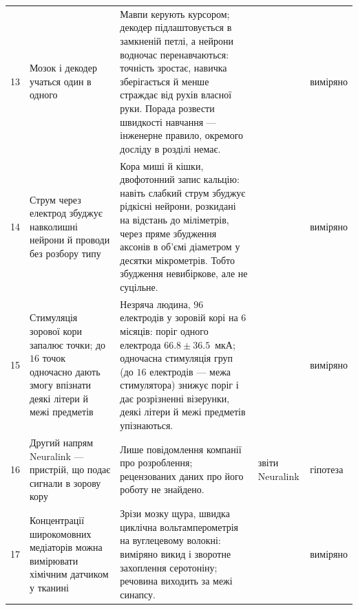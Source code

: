{\begin{longtable}{>{\raggedright}p{0.5cm}>{\raggedright}p{4.0cm}>{\raggedright}p{5.6cm}>{\raggedright}p{2.3cm}>{\raggedright\arraybackslash}p{1.7cm}}
13 & Мозок і декодер учаться один в одного & Мавпи керують курсором; декодер підлаштовується в замкненій петлі, а нейрони водночас перенавчаються: точність зростає, навичка зберігається й менше страждає від рухів власної руки. Порада розвести швидкості навчання --- інженерне правило, окремого досліду в розділі немає. & \cite{Orsborn2014coad} & виміряно \\
14 & Струм через електрод збуджує навколишні нейрони й проводи без розбору типу & Кора миші й кішки, двофотонний запис кальцію: навіть слабкий струм збуджує рідкісні нейрони, розкидані на відстань до міліметрів, через пряме збудження аксонів в об'ємі діаметром у десятки мікрометрів. Тобто збудження невибіркове, але не суцільне. & \cite{Histed2009stim} & виміряно \\
15 & Стимуляція зорової кори запалює точки; до $16$ точок одночасно дають змогу впізнати деякі літери й межі предметів & Незряча людина, $96$ електродів у зоровій корі на $6$ місяців: поріг одного електрода $66.8\pm36.5$~мкА; одночасна стимуляція груп (до $16$ електродів --- межа стимулятора) знижує поріг і дає розрізненні візерунки, деякі літери й межі предметів упізнаються. & \cite{Fernandez2021} & виміряно \\
16 & Другий напрям Neuralink --- пристрій, що подає сигнали в зорову кору & Лише повідомлення компанії про розроблення; рецензованих даних про його роботу не знайдено. & звіти Neuralink & гіпотеза \\
17 & Концентрації широкомовних медіаторів можна вимірювати хімічним датчиком у тканині & Зрізи мозку щура, швидка циклічна вольтамперометрія на вуглецевому волокні: виміряно викид і зворотне захоплення серотоніну; речовина виходить за межі синапсу. & \cite{Bunin1998} & виміряно \\
\bottomrule
\end{longtable}}
